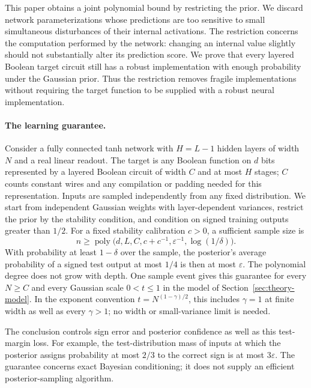 \documentclass[11pt]{article}
\begin{document}
This paper obtains a joint polynomial bound by restricting the prior.
We discard network parameterizations whose predictions are too sensitive
to small simultaneous disturbances of their internal activations. The
restriction concerns the computation performed by the network: changing
an internal value slightly should not substantially alter its prediction
score. We prove that every layered Boolean target circuit still has a
robust implementation with enough probability under the Gaussian prior.
Thus the restriction removes fragile implementations without requiring
the target function to be supplied with a robust neural implementation.

\paragraph{The learning guarantee.}
Consider a fully connected tanh network with $H=L-1$ hidden layers of
width $N$ and a real linear readout. The target is any Boolean function
on $d$ bits represented by a layered Boolean circuit of width $C$ and
at most $H$ stages; $C$ counts constant wires and any compilation or
padding needed for this representation. Inputs are sampled independently
from any fixed distribution. We start from independent Gaussian weights
with layer-dependent variances, restrict the prior by the stability
condition, and condition on signed training outputs greater than $1/2$.
For a fixed stability calibration $c>0$, a sufficient sample size is
\[
 n\ge\operatorname{poly}
       \bigl(d,L,C,c+c^{-1},\varepsilon^{-1},\log(1/\delta)\bigr).
\]
With probability at least $1-\delta$ over the sample, the posterior's
average probability of a signed test output at most $1/4$ is then at
most $\varepsilon$. The polynomial degree does not grow with depth.
One sample event gives this guarantee for every $N\ge C$ and every
Gaussian scale $0<t\le1$ in the model of Section~\ref{sec:theory-model}.
In the exponent convention $t=N^{(1-\gamma)/2}$, this includes
$\gamma=1$ at finite width as well as every $\gamma>1$; no width or
small-variance limit is needed.

The conclusion controls sign error and posterior confidence as well as
this test-margin loss. For example, the test-distribution mass of inputs at which
the posterior assigns probability at most $2/3$ to the correct sign is
at most $3\varepsilon$. The guarantee concerns exact Bayesian conditioning;
it does not supply an efficient posterior-sampling algorithm.
\end{document}
